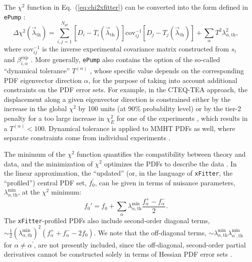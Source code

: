 The $\chi^{2}$ function in Eq.~(\ref{eq:chi2xfitter}) can be converted into the form defined in \texttt{ePump} \cite{Schmidt:2018hvu,Hou:2019gfw}:
\begin{equation}\label{eq:chi2ePump}
\Delta\chi^{2}(\vec{\lambda}_{\textrm{th}})
=\sum_{i,j=1}^{N_\mathit{pt}}
[D_i-T_{i}(\vec{\lambda}_{\textrm{th}})]
\textrm{cov}_{ij}^{-1}[D_j-T_{j}(\vec{\lambda}_{\textrm{th}})]
+\sum_{\alpha}T^2\lambda_{\alpha,\textrm{th}}^{2},
\end{equation}
where $\textrm{cov}_{ij}^{-1}$ is the inverse experimental covariance matrix constructed from $s_i$ and
$\beta_{i,\alpha}^{\textrm{exp}}$ \cite{Gao:2013xoa}.
More generally, \texttt{ePump} also contains the option of the so-called ``dynamical tolerance'' $T^{(\alpha)}$ \cite{Schmidt:2018hvu,Hou:2019gfw}, whose specific value depends on the corresponding PDF eigenvector direction $\alpha$, for the purpose of taking into account additional constraints on the PDF error sets.
For example, in the CTEQ-TEA approach, the displacement along a given eigenvector direction is constrained either by the increase in the global $\chi^2$ by 100 units (at 90\% probability level) or by the tier-2 penalty for a too large increase in $\chi^2_E$ for one of the experiments \cite{Lai:2010vv,Gao:2013xoa}, which results in a $T^{(\alpha)}<100$. Dynamical tolerance is applied to MMHT PDFs as well, where separate constraints come from individual experiments \cite{Harland-Lang:2014zoa}. 


The minimum of the $\chi^{2}$
function quantifies the compatibility between theory and data, and the minimization of $\chi^{2}$ optimizes the PDFs to describe the data \cite{Paukkunen:2014zia,Schmidt:2018hvu}.
In the linear approximation, the ``updated'' (or, in the language of \texttt{xFitter}, the ``profiled'') central PDF set, $f_{0}^{'}$, can be given in terms of nuisance parameters,
$\lambda_{\alpha,\textrm{th}}^{\textrm{min}}$, at the $\chi^{2}$ minimum:
\begin{equation}\label{eq:updatePDF}
f_{0}'=f_{0}+\sum_{\alpha} \lambda^{\textrm{min}}_{\alpha,\textrm{th}}\frac{f_{\alpha}^{+}-f_{\alpha}^{-}}{2}.
\end{equation}
The \texttt{xFitter}-profiled PDFs also include second-order diagonal terms, \linebreak
$\sim\! \frac{1}{2}(\lambda^{\textrm{min}}_{\alpha,\textrm{th}})^{2}(f_\alpha^{+}+f_\alpha^{-}-2f_0)$.
We note that the off-diagonal terms, $\sim\! \lambda^{\textrm{min}}_{\alpha,\textrm{th}}\lambda^{\textrm{min}}_{\alpha^\prime,\textrm{th}}$ for $\alpha\neq \alpha^\prime$, are not presently included,
since the off-diagonal, second-order partial derivatives cannot be constructed solely in terms of Hessian PDF error sets \cite{Hou:2016sho}. 
 
